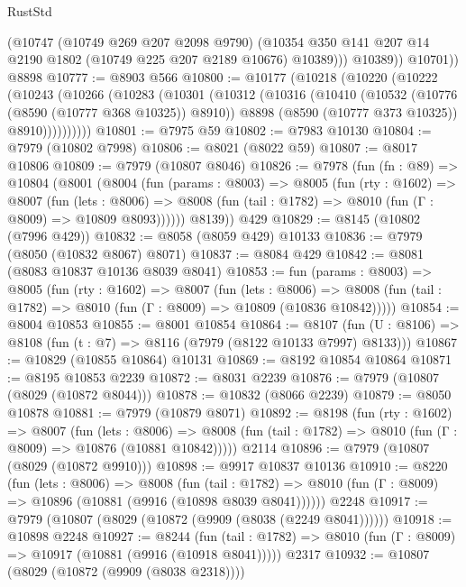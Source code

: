 \begin{lexlean}{RustStd}
\begin{coremodule}
              (@10747
                (@10749 @269 @207 @2098 @9790)
                (@10354 @350 @141 @207 @14 @2190 @1802 (@10749 @225 @207 @2189 @10676) @10389)))
            @10389))
        @10701))
    @8898
@10777 := @8903 @566
@10800 := @10177
    (@10218
      (@10220
        (@10222
          (@10243
            (@10266
              (@10283
                (@10301
                  (@10312
                    (@10316
                      (@10410
                        (@10532 (@10776 (@8590 (@10777 @368 @10325)) @8910))
                        @8898
                        (@8590 (@10777 @373 @10325))
                        @8910))))))))))
@10801 := @7975 @59
@10802 := @7983 @10130
@10804 := @7979 (@10802 @7998)
@10806 := @8021 (@8022 @59)
@10807 := @8017 @10806
@10809 := @7979 (@10807 @8046)
@10826 := @7978
    (fun (fn : @89) =>
    @10804
      (@8001
        (@8004
          (fun (params : @8003) =>
          @8005
            (fun (rty : @1602) =>
            @8007
              (fun (lets : @8006) =>
              @8008 (fun (tail : @1782) => @8010 (fun (Γ : @8009) => @10809 @8093))))))
        @8139))
    @429
@10829 := @8145 (@10802 (@7996 @429))
@10832 := @8058 (@8059 @429) @10133
@10836 := @7979 (@8050 (@10832 @8067) @8071)
@10837 := @8084 @429
@10842 := @8081 (@8083 @10837 @10136 @8039 @8041)
@10853 := fun (params : @8003) =>
  @8005
    (fun (rty : @1602) =>
    @8007
      (fun (lets : @8006) =>
      @8008 (fun (tail : @1782) => @8010 (fun (Γ : @8009) => @10809 (@10836 @10842)))))
@10854 := @8004 @10853
@10855 := @8001 @10854
@10864 := @8107
    (fun (U : @8106) => @8108 (fun (t : @7) => @8116 (@7979 (@8122 @10133 @7997) @8133)))
@10867 := @10829 (@10855 @10864) @10131
@10869 := @8192 @10854 @10864
@10871 := @8195 @10853 @2239
@10872 := @8031 @2239
@10876 := @7979 (@10807 (@8029 (@10872 @8044)))
@10878 := @10832 (@8066 @2239)
@10879 := @8050 @10878
@10881 := @7979 (@10879 @8071)
@10892 := @8198
    (fun (rty : @1602) =>
    @8007
      (fun (lets : @8006) =>
      @8008 (fun (tail : @1782) => @8010 (fun (Γ : @8009) => @10876 (@10881 @10842)))))
    @2114
@10896 := @7979 (@10807 (@8029 (@10872 @9910)))
@10898 := @9917 @10837 @10136
@10910 := @8220
    (fun (lets : @8006) =>
    @8008
      (fun (tail : @1782) =>
      @8010 (fun (Γ : @8009) => @10896 (@10881 (@9916 (@10898 @8039 @8041))))))
    @2248
@10917 := @7979 (@10807 (@8029 (@10872 (@9909 (@8038 (@2249 @8041))))))
@10918 := @10898 @2248
@10927 := @8244
    (fun (tail : @1782) => @8010 (fun (Γ : @8009) => @10917 (@10881 (@9916 (@10918 @8041)))))
    @2317
@10932 := @10807 (@8029 (@10872 (@9909 (@8038 @2318))))

\end{coremodule}
\end{lexlean}
